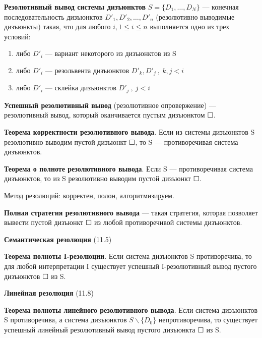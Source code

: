 \documentclass[a4paper,12pt]{article}
\begin{document}
\textbf{Резолютивный вывод системы дизъюнктов} $S = \{D_1, \dots, D_N\}$ --- конечная последовательность дизъюнктов $D'_1, D'_2, \dots, D'_n$ (резолютивно выводимые дизъюнкты) такая, что для любого $i, 1 \leqslant i \leqslant n$ выполняется одно из трех условий:
\begin{enumerate}
 \item либо $D'_i$ --- вариант некоторого из дизъюнктов из S
 \item либо $D'_i$ --- резольвента дизъюнктов $D'_k, D'_j~,~ k,j < i$
 \item либо $D'_i$ --- склейка дизъюнктов $D'_j~,~j<i$
\end{enumerate}

\textbf{Успешный резолютивный вывод} (резолютивное опровержение) --- резолютивный вывод, который оканчивается пустым дизъюнктом $\Square$.

\textbf{Теорема корректности резолютивного вывода}. Если из системы дизъюнктов S резолютивно выводим пустой дизъюнкт $\Square$, то S --- противоречивая система дизъюнктов.


\textbf{Теорема о полноте резолютивного вывода}. Если S --- противоречивая система дизъюнктов, то из S резолютивно выводим пустой дизъюнкт $\Square$.

Метод резолюций: корректен, полон, алгоритмизируем.


\textbf{Полная стратегия резолютивного вывода} --- такая стратегия, которая позволяет вывести пустой дизъюнкт $\Square$ из любой противоречивой системы дизъюнктов.

\textbf{Семантическая резолюция} (11.5)

\textbf{Теорема полноты I-резолюции}. Если система дизъюнктов S противоречива, то для любой интерпретации I существует успешный I-резолютивный вывод пустого дизъюнктов $\Square$ из S.

\textbf{Линейная резолюция} (11.8)

\textbf{Теорема полноты линейного резолютивного вывода}. Если система дизъюнктов S противоречива, а система дизъюнктов $S \backslash \{D_0\}$ непротиворечива, то существует успешный линейный резолютивный вывод пустого дизъюнкта $\Square$ из S.

\end{document}
